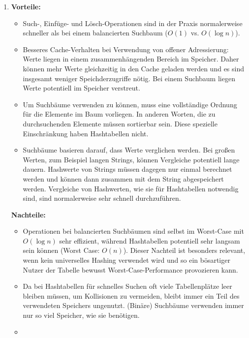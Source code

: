\documentclass[11pt,a4paper]{article}
\begin{document}
\begin{loesung}
    \begin{enumerate}
        \item 
        \textbf{Vorteile:}
        \begin{itemize}
            \item Such-, Einfüge- und Lösch-Operationen sind in der Praxis normalerweise schneller als bei einem balancierten Suchbaum ($O(1)$ vs. $O(\log n)$).
            \item Besseres Cache-Verhalten bei Verwendung von offener Adressierung: Werte liegen in einem zusammenhängenden Bereich im Speicher.
            Daher können mehr Werte gleichzeitig in den Cache geladen werden und es sind insgesamt weniger Speichderzugriffe nötig.
            Bei einem Suchbaum liegen Werte potentiell im Speicher verstreut.
            \item Um Suchbäume verwenden zu können, muss eine vollständige Ordnung für die Elemente im Baum vorliegen.
            In anderen Worten, die zu durchsuchenden Elemente müssen sortierbar sein.
            Diese spezielle Einschränkung haben Hashtabellen nicht.
            \item Suchbäume basieren darauf, dass Werte verglichen werden.  
            Bei großen Werten, zum Beispiel langen Strings, können Vergleiche potentiell lange dauern.
            Hashwerte von Strings müssen dagegen nur einmal berechnet werden und können dann zusammen mit dem String abgespeichert werden.
            Vergleiche von Hashwerten, wie sie für Hashtabellen notwendig sind, sind normalerweise sehr schnell durchzuführen.
        \end{itemize}
        \textbf{Nachteile:}
        \begin{itemize}
            \item Operationen bei balancierten Suchbäumen sind selbst im Worst-Case mit $O(\log n)$ sehr effizient, während Hashtabellen potentiell sehr langsam sein können (Worst Case: $O(n)$).
            Dieser Nachteil ist besonders relevant, wenn kein universelles Hashing verwendet wird und so ein bösartiger Nutzer der Tabelle bewusst Worst-Case-Performance provozieren kann.
            \item Da bei Hashtabellen für schnelles Suchen oft viele Tabellenplätze leer bleiben müssen, um Kollisionen zu vermeiden, bleibt immer ein Teil des verwendeten Speichers ungenutzt.
            (Binäre) Suchbäume verwenden immer nur so viel Speicher, wie sie benötigen.
            \item 

\end{itemize}
\end{enumerate}
\end{loesung}
\end{document}
